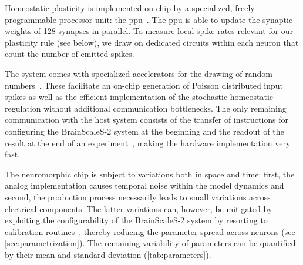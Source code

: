Homeostatic plasticity is implemented on-chip by a specialized, freely-programmable processor unit: the \gls{ppu}~\cite{friedmann_demonstrating_2017}.
The \gls{ppu} is able to update the synaptic weights of \SI{128}{} synapses in parallel.
To measure local spike rates relevant for our plasticity rule (see below), we draw on dedicated circuits within each neuron that count the number of emitted spikes.

The system comes with specialized accelerators for the drawing of random numbers~\citep{schemmel_accelerated_2020}.
These facilitate an on-chip generation of Poisson distributed input spikes as well as the efficient implementation of the stochastic homeostatic regulation without additional communication bottlenecks.
The only remaining communication with the host system consists of the transfer of instructions for configuring the BrainScaleS-2 system at the beginning and the readout of the result at the end of an experiment~\citep{muller_extending_2020,muller_scalable_2022}, making the hardware implementation very fast.

The neuromorphic chip is subject to variations both in space and time:
first, the analog implementation causes temporal noise within the model dynamics and second, the production process necessarily leads to small variations across electrical components.
The latter variations can, however, be mitigated by exploiting the configurability of the BrainScaleS-2 system by resorting to calibration routines~\citep{muller_scalable_2022}, thereby reducing the parameter spread across neurons (see \cref{sec:parametrization}).
The remaining variability of parameters can be quantified by their mean and standard deviation (\cref{tab:parameters}).


